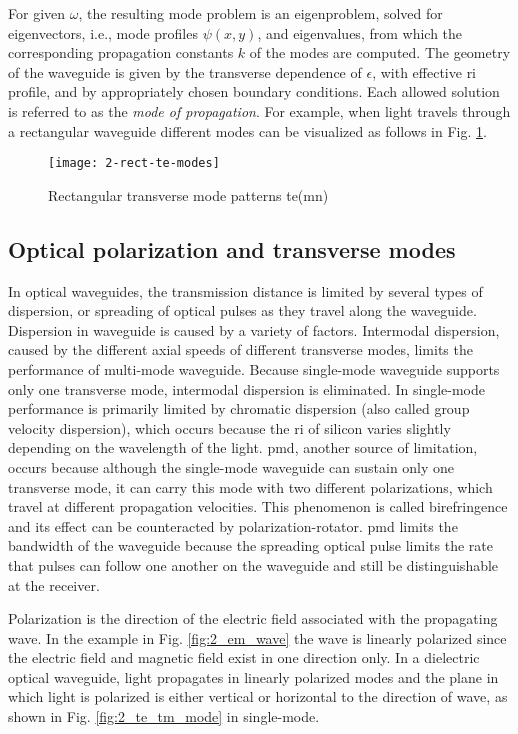 \documentclass[../report.tex]{subfiles}
\begin{document}
For given $\omega$, the resulting mode problem is an eigenproblem, solved for eigenvectors, i.e., mode profiles $\psi(x, y)$, and eigenvalues, from which the corresponding propagation constants $k$ of the modes are computed. The geometry of the waveguide is given by the transverse dependence of $\epsilon$, with effective \gls{ri} profile, and by appropriately chosen boundary conditions. Each allowed solution is referred to as the \textit{mode of propagation}. For example, when light travels through a rectangular waveguide different modes can be visualized as follows in Fig. \ref{fig:2_rect_te_modes}.
\begin{figure}[H]
	\centering
	\texttt{[image: 2-rect-te-modes]}
	\caption{Rectangular transverse mode patterns \gls{te}(mn)}
	\label{fig:2_rect_te_modes}
\end{figure}
		
		\subsection{Optical polarization and transverse modes}
In optical waveguides, the transmission distance is limited by several types of dispersion, or spreading of optical pulses as they travel along the waveguide. Dispersion in waveguide is caused by a variety of factors. Intermodal dispersion, caused by the different axial speeds of different transverse modes, limits the performance of multi-mode waveguide. Because single-mode waveguide supports only one transverse mode, intermodal dispersion is eliminated. In single-mode performance is primarily limited by chromatic dispersion (also called group velocity dispersion), which occurs because the \gls{ri} of silicon varies slightly depending on the wavelength of the light. \gls{pmd}, another source of limitation, occurs because although the single-mode waveguide can sustain only one transverse mode, it can carry this mode with two different polarizations, which travel at different propagation velocities. This phenomenon is called birefringence and its effect can be counteracted by polarization-rotator. \gls{pmd} limits the bandwidth of the waveguide because the spreading optical pulse limits the rate that pulses can follow one another on the waveguide and still be distinguishable at the receiver.\par

Polarization is the direction of the electric field associated with the propagating wave. In the example in Fig. \ref{fig:2_em_wave} the wave is linearly polarized since the electric field and magnetic field exist in one direction only. In a dielectric optical waveguide, light propagates in linearly polarized modes and the plane in which light is polarized is either vertical or horizontal to the direction of wave, as shown in Fig. \ref{fig:2_te_tm_mode} in single-mode.
		
\end{document}
